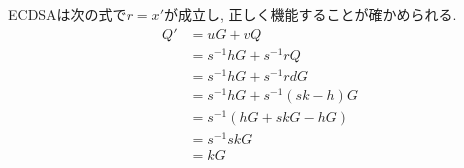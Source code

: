 \vspace{1em}
\indent ECDSAは次の式で$r=x'$が成立し, 正しく機能することが確かめられる.\\
\begin{align*}
  Q'  &= uG + vQ\\
      &= s^{-1}hG + s^{-1}rQ \\
      &= s^{-1}hG + s^{-1}rdG \\
      &= s^{-1}hG + s^{-1}(sk-h)G \\
      &= s^{-1}(hG + skG - hG) \\
      &= s^{-1}skG \\
      &= kG
\end{align*}
